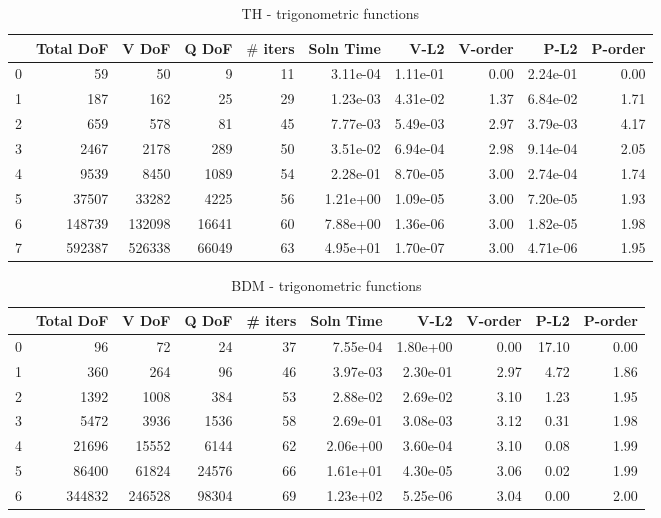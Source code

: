 \documentclass[12pt]{extarticle}
\numberwithin{equation}{section}    %
\begin{document}
\begin{landscape}

\begin{table}

\begin{tabular}{lrrrrrrrrr}
\hline
{} &  Total DoF &   V DoF &  Q DoF &  $\#$ iters &  Soln Time &      V-L2 &  V-order &      P-L2 &  P-order \\
\hline
0 &         59 &      50 &      9 &       11 &   3.11e-04 &  1.11e-01 &     0.00 &  2.24e-01 &     0.00 \\
1 &        187 &     162 &     25 &       29 &   1.23e-03 &  4.31e-02 &     1.37 &  6.84e-02 &     1.71 \\
2 &        659 &     578 &     81 &       45 &   7.77e-03 &  5.49e-03 &     2.97 &  3.79e-03 &     4.17 \\
3 &       2467 &    2178 &    289 &       50 &   3.51e-02 &  6.94e-04 &     2.98 &  9.14e-04 &     2.05 \\
4 &       9539 &    8450 &   1089 &       54 &   2.28e-01 &  8.70e-05 &     3.00 &  2.74e-04 &     1.74 \\
5 &      37507 &   33282 &   4225 &       56 &   1.21e+00 &  1.09e-05 &     3.00 &  7.20e-05 &     1.93 \\
6 &     148739 &  132098 &  16641 &       60 &   7.88e+00 &  1.36e-06 &     3.00 &  1.82e-05 &     1.98 \\
7 &     592387 &  526338 &  66049 &       63 &   4.95e+01 &  1.70e-07 &     3.00 &  4.71e-06 &     1.95 \\
\hline
\end{tabular}
\caption{TH - trigonometric functions}
\end{table}


\begin{table}

\begin{tabular}{lrrrrrrrrr}
\hline
{} &  Total DoF &   V DoF &  Q DoF &  \# iters &  Soln Time &      V-L2 &  V-order &   P-L2 &  P-order \\
\hline
0 &         96 &      72 &     24 &       37 &   7.55e-04 &  1.80e+00 &     0.00 &  17.10 &     0.00 \\
1 &        360 &     264 &     96 &       46 &   3.97e-03 &  2.30e-01 &     2.97 &   4.72 &     1.86 \\
2 &       1392 &    1008 &    384 &       53 &   2.88e-02 &  2.69e-02 &     3.10 &   1.23 &     1.95 \\
3 &       5472 &    3936 &   1536 &       58 &   2.69e-01 &  3.08e-03 &     3.12 &   0.31 &     1.98 \\
4 &      21696 &   15552 &   6144 &       62 &   2.06e+00 &  3.60e-04 &     3.10 &   0.08 &     1.99 \\
5 &      86400 &   61824 &  24576 &       66 &   1.61e+01 &  4.30e-05 &     3.06 &   0.02 &     1.99 \\
6 &     344832 &  246528 &  98304 &       69 &   1.23e+02 &  5.25e-06 &     3.04 &   0.00 &     2.00 \\
\hline
\end{tabular}

\caption{BDM - trigonometric functions}
\end{table}

\end{landscape}
\end{document}
